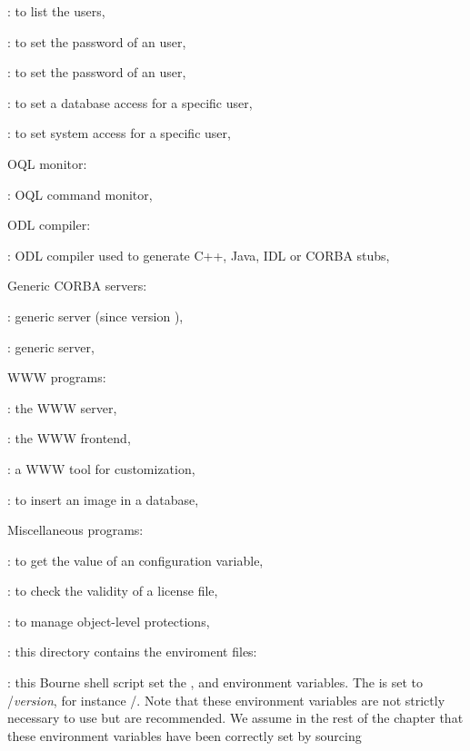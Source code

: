 \item {}: to list the \eyedb users,
\item {}: to set the password of an \eyedb user,
\item {}:  to set the password of an \eyedb user,
\item {}: to set a database access for a specific user,
\item {}: to set system access for a specific user,
\ei
\item OQL monitor:
\bi
\item {}: OQL command monitor,
\ei
\item ODL compiler:
\bi
\item {}: ODL compiler used to generate C++, Java, IDL or
CORBA stubs,
\ei
\item Generic CORBA servers:
\bi
\item {}:  generic \eyedb server (since
version \eyedbversion),
\item {}:  generic \eyedb server,
\ei
\item WWW programs:
\bi
\item {}: the \eyedb WWW server,
\item {}: the \eyedb WWW frontend,
\item {}: a WWW tool for customization,
\item {}: to insert an image in a database,
\ei
\item Miscellaneous programs:
\bi
\item {}: to get the value of an \eyedb configuration variable,
\item {}: to check the validity of a license file,
\item {}: to manage object-level protections,
\ei
\ee
\item {}: this directory contains the enviroment files:
\bi
\item {}: this Bourne shell script set the
,  and  environment variables.
The  is set to \tdir/\emph{version}, for instance
\tdir/.
Note that these environment variables are not strictly necessary to use
\eyedb but are recommended. We assume in the rest of the chapter that
these environment variables have been correctly set by sourcing
